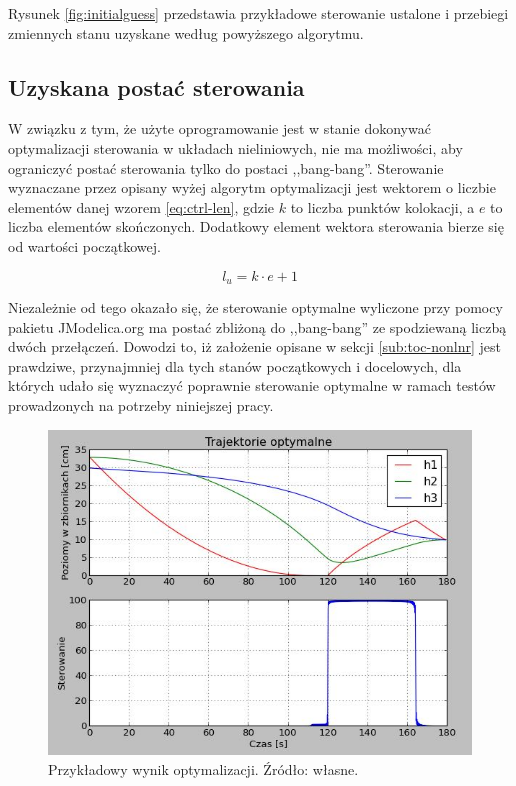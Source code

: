Rysunek \ref{fig:initialguess} przedstawia przykładowe sterowanie ustalone i przebiegi zmiennych stanu uzyskane według powyższego algorytmu.


\subsection{Uzyskana postać sterowania}
\label{sub:opt-ctrl-form}

W związku z tym, że użyte oprogramowanie jest w stanie dokonywać optymalizacji sterowania w układach nieliniowych, nie ma możliwości, aby ograniczyć postać sterowania tylko do postaci ,,bang-bang''. Sterowanie wyznaczane przez opisany wyżej algorytm optymalizacji jest wektorem o liczbie elementów danej wzorem \ref{eq:ctrl-len}, gdzie $k$ to liczba punktów kolokacji, a $e$ to liczba elementów skończonych. Dodatkowy element wektora sterowania bierze się od wartości początkowej.

\begin{equation}\label{eq:ctrl-len}
l_{u} = k \cdot e + 1
\end{equation}

Niezależnie od tego okazało się, że sterowanie optymalne wyliczone przy pomocy pakietu JModelica.org ma postać zbliżoną do ,,bang-bang'' ze spodziewaną liczbą dwóch przełączeń. Dowodzi to, iż założenie opisane w sekcji \ref{sub:toc-nonlnr} jest prawdziwe, przynajmniej dla tych stanów początkowych i docelowych, dla których udało się wyznaczyć poprawnie sterowanie optymalne w ramach testów prowadzonych na potrzeby niniejszej pracy.

\begin{figure}[ht]
    \centering
    \includegraphics{Grafika/optimisation_example}
    \caption{Przykładowy wynik optymalizacji. Źródło: własne.}
    \label{fig:optimisationexample}
\end{figure}

